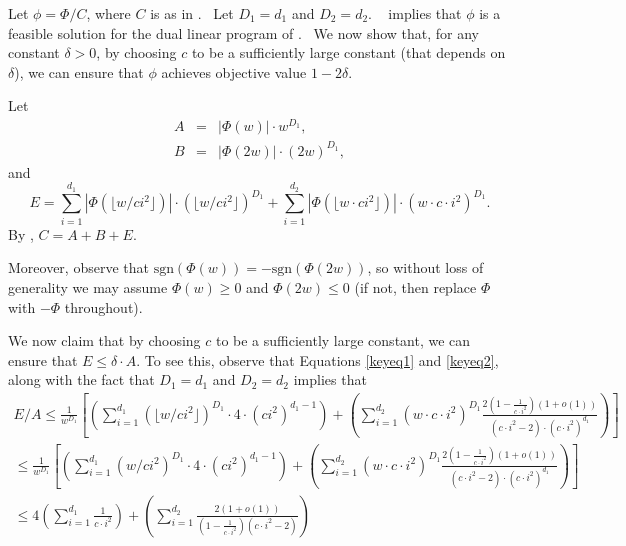Let $\phi =\Phi /C$, where $C$ is as in . \ Let $
D_{1}=d_{1}$ and $D_{2}=d_{2}$. \  implies that $\phi $ is a
feasible solution for the dual linear program of . \ We now
show that, for any constant $\delta >0$, by choosing $c$ to be a
sufficiently large constant (that depends on $\delta $), we can ensure
that $\phi $ achieves objective value $1-2\delta $.

Let
\begin{eqnarray*}
A &=&|\Phi (w)|\cdot w^{D_{1}}, \\
B &=&|\Phi (2w)|\cdot (2w)^{D_{1}},
\end{eqnarray*}
and
\begin{equation*}
E=\sum_{i=1}^{d_{1}}|\Phi (\lfloor w/ci^{2}\rfloor )|\cdot \left( \lfloor
w/ci^{2}\rfloor \right) ^{D_{1}}+\sum_{i=1}^{d_{2}}|\Phi (\lfloor w\cdot
ci^{2}\rfloor )|\cdot \left( w\cdot c\cdot i^{2}\right) ^{D_{1}}.
\end{equation*}
By , $C=A+B+E$.

Moreover, observe that $\text{sgn}(\Phi(w)) = - \text{sgn}(\Phi(2w))$, so
without loss of generality we may assume $\Phi(w) \geq 0$ and $\Phi(2w) \leq
0$ (if not, then replace $\Phi$ with $-\Phi$ throughout).

We now claim that by choosing $c$ to be a sufficiently large constant, we
can ensure that $E \leq \delta \cdot A$. To see this, observe that
Equations \eqref{keyeq1} and \eqref{keyeq2}, along with the fact that $
D_1=d_1$ and $D_2=d_2$ implies that
\begin{align*}
E/A \leq \frac{1}{w^{D_1}} \left[ \left(\sum_{i=1}^{d_1} \left(\lfloor
w/ci^2\rfloor\right)^{D_1}\cdot 4 \cdot \left(ci^2\right)^{d_1-1} \right) +
\left(\sum_{i=1}^{d_2} \left(w \cdot c \cdot i^2\right)^{D_1} \frac{2
\left(1-\frac{1}{c \cdot i^2}\right)\left(1+o(1)\right)}{(c \cdot i^2 - 2)
\cdot (c\cdot i^2)^{d_1}}\right)\right] \\
\leq \frac{1}{w^{D_1}} \left[ \left(\sum_{i=1}^{d_1}
\left(w/ci^2\right)^{D_1} \cdot 4 \cdot \left(ci^2\right)^{d_1-1} \right) +
\left(\sum_{i=1}^{d_2} \left(w \cdot c \cdot i^2\right)^{D_1} \frac{2
\left(1-\frac{1}{c \cdot i^2}\right)\left(1+o(1)\right)}{(c \cdot i^2 - 2)
\cdot (c\cdot i^2)^{d_1}}\right) \right] \\
\leq 4 \left(\sum_{i=1}^{d_1} \frac{1}{c\cdot i^2}\right) +
\left(\sum_{i=1}^{d_2} \frac{2 \left(1+o(1)\right)}{\left(1-\frac{1}{c \cdot
i^2}\right) \left(c \cdot i^2 - 2\right)}\right) \\
\end{align*}


